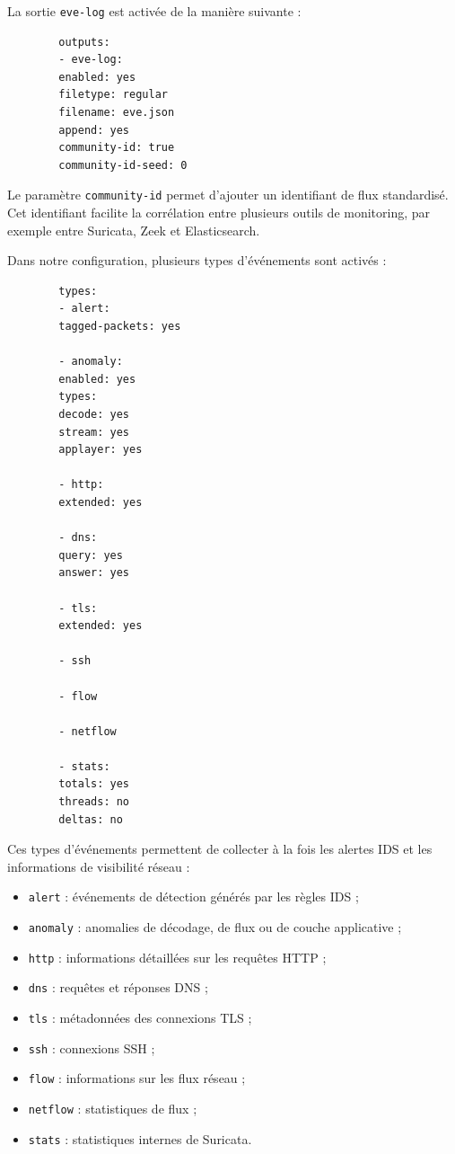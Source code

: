 \documentclass[12pt,a4paper,oneside]{report}
\begin{document}
	La sortie \texttt{eve-log} est activée de la manière suivante :
	
	\begin{lstlisting}
		outputs:
		- eve-log:
		enabled: yes
		filetype: regular
		filename: eve.json
		append: yes
		community-id: true
		community-id-seed: 0
	\end{lstlisting}
	
	Le paramètre \texttt{community-id} permet d'ajouter un identifiant de flux standardisé. Cet identifiant facilite la corrélation entre plusieurs outils de monitoring, par exemple entre Suricata, Zeek et Elasticsearch.
	
	Dans notre configuration, plusieurs types d'événements sont activés :
	
	\begin{lstlisting}
		types:
		- alert:
		tagged-packets: yes
		
		- anomaly:
		enabled: yes
		types:
		decode: yes
		stream: yes
		applayer: yes
		
		- http:
		extended: yes
		
		- dns:
		query: yes
		answer: yes
		
		- tls:
		extended: yes
		
		- ssh
		
		- flow
		
		- netflow
		
		- stats:
		totals: yes
		threads: no
		deltas: no
	\end{lstlisting}
	
	Ces types d'événements permettent de collecter à la fois les alertes IDS et les informations de visibilité réseau :
	
	\begin{itemize}
		\item \texttt{alert} : événements de détection générés par les règles IDS ;
		\item \texttt{anomaly} : anomalies de décodage, de flux ou de couche applicative ;
		\item \texttt{http} : informations détaillées sur les requêtes HTTP ;
		\item \texttt{dns} : requêtes et réponses DNS ;
		\item \texttt{tls} : métadonnées des connexions TLS ;
		\item \texttt{ssh} : connexions SSH ;
		\item \texttt{flow} : informations sur les flux réseau ;
		\item \texttt{netflow} : statistiques de flux ;
		\item \texttt{stats} : statistiques internes de Suricata.
	\end{itemize}
	
\end{document}
